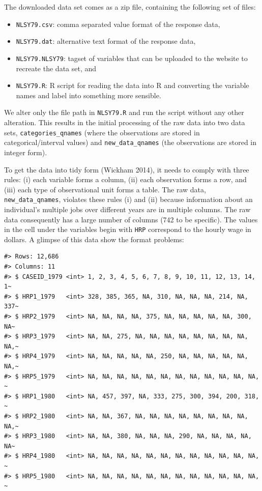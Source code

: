 \documentclass{article}
\providecommand{\tightlist}{%
  \setlength{\itemsep}{0pt}\setlength{\parskip}{0pt}}
\begin{document}
The downloaded data set comes as a zip file, containing the following set of files:

\begin{itemize}
\tightlist
\item
  \texttt{NLSY79.csv}: comma separated value format of the response data,
\item
  \texttt{NLSY79.dat}: alternative text format of the response data,
\item
  \texttt{NLSY79.NLSY79}: tagset of variables that can be uploaded to the website to recreate the data set, and
\item
  \texttt{NLSY79.R}: R script for reading the data into R and converting the variable names and label into something more sensible.
\end{itemize}

We alter only the file path in \texttt{NLSY79.R} and run the script without any other alteration. This results in the initial processing of the raw data into two data sets, \texttt{categories\_qnames} (where the observations are stored in categorical/interval values) and \texttt{new\_data\_qnames} (the observations are stored in integer form).

To get the data into tidy form (Wickham 2014), it needs to comply with three rules: (i) each variable forms a column, (ii) each observation forms a row, and (iii) each type of observational unit forms a table. The raw data, \texttt{new\_data\_qnames}, violates these rules (i) and (ii) because information about an individual's multiple jobs over different years are in multiple columns. The raw data consequently has a large number of columns (742 to be specific). The values in the cell under the variables begin with \texttt{HRP} correspond to the hourly wage in dollars. A glimpse of this data show the format problems:

\begin{verbatim}
#> Rows: 12,686
#> Columns: 11
#> $ CASEID_1979 <int> 1, 2, 3, 4, 5, 6, 7, 8, 9, 10, 11, 12, 13, 14, 1~
#> $ HRP1_1979   <int> 328, 385, 365, NA, 310, NA, NA, NA, 214, NA, 337~
#> $ HRP2_1979   <int> NA, NA, NA, NA, 375, NA, NA, NA, NA, NA, 300, NA~
#> $ HRP3_1979   <int> NA, NA, 275, NA, NA, NA, NA, NA, NA, NA, NA, NA,~
#> $ HRP4_1979   <int> NA, NA, NA, NA, NA, 250, NA, NA, NA, NA, NA, NA,~
#> $ HRP5_1979   <int> NA, NA, NA, NA, NA, NA, NA, NA, NA, NA, NA, NA, ~
#> $ HRP1_1980   <int> NA, 457, 397, NA, 333, 275, 300, 394, 200, 318, ~
#> $ HRP2_1980   <int> NA, NA, 367, NA, NA, NA, NA, NA, NA, NA, NA, NA,~
#> $ HRP3_1980   <int> NA, NA, 380, NA, NA, NA, 290, NA, NA, NA, NA, NA~
#> $ HRP4_1980   <int> NA, NA, NA, NA, NA, NA, NA, NA, NA, NA, NA, NA, ~
#> $ HRP5_1980   <int> NA, NA, NA, NA, NA, NA, NA, NA, NA, NA, NA, NA, ~
\end{verbatim}
\end{document}
